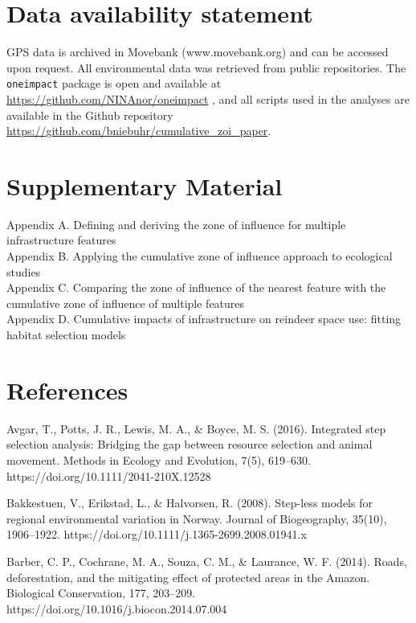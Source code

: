 \documentclass[titlepage]{article}
\begin{document}
\section*{Data availability statement}

GPS data is archived in Movebank (www.movebank.org) and can be accessed upon request. All environmental data was retrieved from public repositories. The \verb|oneimpact| package is open and available at \url{https://github.com/NINAnor/oneimpact} \citep{niebuhr_oneimpact_2023}, and all scripts used in the analyses are available in the Github repository \url{https://github.com/bniebuhr/cumulative_zoi_paper}.

\section*{Supplementary Material}

Appendix A. Defining and deriving the zone of influence for multiple infrastructure features \\
Appendix B. Applying the cumulative zone of influence approach to ecological studies \\
Appendix C. Comparing the zone of influence of the nearest feature with the cumulative zone of influence of multiple features \\ 
Appendix D. Cumulative impacts of infrastructure on reindeer space use: fitting habitat selection models


%

\section*{References}

Avgar, T., Potts, J. R., Lewis, M. A., & Boyce, M. S. (2016). Integrated step selection analysis: Bridging the gap between resource selection and animal movement. Methods in Ecology and Evolution, 7(5), 619–630. https://doi.org/10.1111/2041-210X.12528

Bakkestuen, V., Erikstad, L., & Halvorsen, R. (2008). Step-less models for regional environmental variation in Norway. Journal of Biogeography, 35(10), 1906–1922. https://doi.org/10.1111/j.1365-2699.2008.01941.x

Barber, C. P., Cochrane, M. A., Souza, C. M., & Laurance, W. F. (2014). Roads, deforestation, and the mitigating effect of protected areas in the Amazon. Biological Conservation, 177, 203–209. \\  https://doi.org/10.1016/j.biocon.2014.07.004
\end{document}
